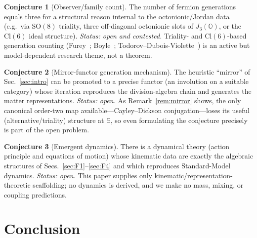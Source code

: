 \documentclass[aps,prresearch,onecolumn,amsmath,amssymb,nofootinbib]{revtex4-2}
\theoremstyle{plain}\newtheorem{theorem}{Theorem}[section]\newtheorem{proposition}[theorem]{Proposition}\newtheorem{lemma}[theorem]{Lemma}\newtheorem{corollary}[theorem]{Corollary}
\theoremstyle{definition}\newtheorem{definition}[theorem]{Definition}\newtheorem{conjecture}[theorem]{Conjecture}
\theoremstyle{remark}\newtheorem{remark}[theorem]{Remark}
\begin{document}
\begin{conjecture}[Observer/family count]
\label{conj:families}
The number of fermion generations equals three for a structural reason internal to the octonionic/Jordan data (e.g.\ via $\mathrm{SO}(8)$ triality, three off-diagonal octonionic slots of $J_3(\mathbb{O})$, or the $\mathrm{Cl}(6)$ ideal structure). \emph{Status: open and contested.} Triality- and $\mathrm{Cl}(6)$-based generation counting (Furey~\cite{Furey2014}; Boyle~\cite{Boyle2020}; Todorov--Dubois-Violette~\cite{TodorovDV2018}) is an active but model-dependent research theme, not a theorem.
\end{conjecture}

\begin{conjecture}[Mirror-functor generation mechanism]
\label{conj:mirror}
The heuristic ``mirror'' of Sec.~\ref{sec:intro} can be promoted to a precise functor (an involution on a suitable category) whose iteration reproduces the division-algebra chain and generates the matter representations. \emph{Status: open.} As Remark~\ref{rem:mirror} shows, the only canonical order-two map available---Cayley--Dickson conjugation---loses its useful (alternative/triality) structure at $\mathbb{S}$, so even formulating the conjecture precisely is part of the open problem.
\end{conjecture}

\begin{conjecture}[Emergent dynamics]
\label{conj:dynamics}
There is a dynamical theory (action principle and equations of motion) whose kinematic data are exactly the algebraic structures of Secs.~\ref{sec:F1}--\ref{sec:F4} and which reproduces Standard-Model dynamics. \emph{Status: open.} This paper supplies only kinematic/representation-theoretic scaffolding; no dynamics is derived, and we make no mass, mixing, or coupling predictions.
\end{conjecture}

\section{Conclusion}
\label{sec:conclusion}
\end{document}
